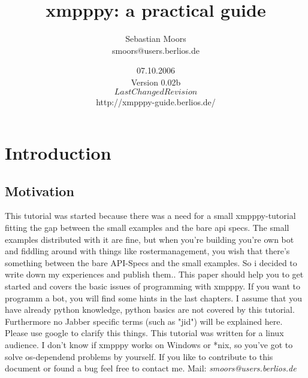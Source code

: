 \documentclass[a4paper,10pt]{report}
\title{xmpppy: a practical guide}
\author{Sebastian Moors \\[1cm] smoors@users.berlios.de}
\date{07.10.2006 \\[1cm] Version 0.02b \\[1cm] $LastChangedRevision$ \\[1cm] http://xmpppy-guide.berlios.de/}
\begin{document}
\begin{titlepage}
\maketitle


\end{titlepage}
\tableofcontents
\newpage




\chapter{Introduction}
\section{Motivation}
This tutorial was started because there was a need for a small xmpppy-tutorial fitting the gap between the small examples and the bare api specs. The small examples distributed with it are fine, but when you're building you're own bot and fiddling around with things like rostermanagement, you wish that there's something between the bare API-Specs and the small examples. So i decided to write down my experiences and publish them..
\newline
This paper should help you to get started and covers the basic issues of programming with xmpppy.
If you want to programm a bot, you will find some hints in the last chapters.
I assume that you have already python knowledge, python basics are not covered by this tutorial.
\newline
\newline
Furthermore no Jabber specific terms (such as "jid") will be explained here. Please use google to clarify this things.
\newline
\newline
This tutorial was written for a linux audience. I don't know if xmpppy works on Windows or *nix, so you've got to solve os-dependend problems by yourself.
\newline
\newline
If you like to contribute to this document or found a bug feel free to contact me.
\newline
\newline Mail: \textit{smoors@users.berlios.de}
\end{document}
